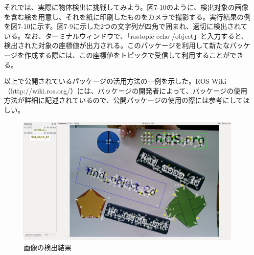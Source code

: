 それでは、実際に物体検出に挑戦してみよう。図7-10のように、検出対象の画像を含む絵を用意し、それを紙に印刷したものをカメラで撮影する。実行結果の例を図7-10に示す。図7-9に示した2つの文字列が四角で囲まれ、適切に検出されている。なお、ターミナルウィンドウで、「rostopic echo /object」と入力すると、検出された対象の座標値が出力される。このパッケージを利用して新たなパッケージを作成する際には、この座標値をトピックで受信して利用することができる。

以上で公開されているパッケージの活用方法の一例を示した。ROS Wiki（http://wiki.ros.org/）には、パッケージの開発者によって、パッケージの使用方法が詳細に記述されているので、公開パッケージの使用の際には参考にしてほしい。

\begin{figure}[htp]
  \centering
  \includegraphics[width=\columnwidth]{pictures/chapter7/pic_07_10.png}
  \caption{画像の検出結果}
\end{figure}





